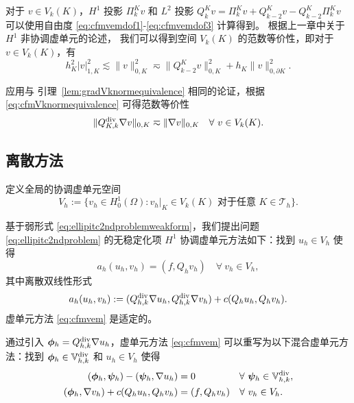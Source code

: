 对于 $v\in V_k(K)$，$H^1$ 投影 $\Pi_k^Kv$ 和 $L^2$ 投影 $Q_k^Kv= \Pi_k^Kv + Q_{k-2}^Kv-Q_{k-2}^K\Pi_k^Kv$ 可以使用自由度 \eqref{eq:cfmvemdof1}-\eqref{eq:cfmvemdof3} 计算得到。
根据上一章中关于 $H^1$ 非协调虚单元的论述，
我们可以得到空间 $V_k(K)$ 的范数等价性，即对于 $v\in V_k(K)$，有
\begin{equation}\label{eq:cfmVknormequivalence}
h_K^2|v|_{1,K}^2\lesssim\|v\|_{0,K}^2\eqsim \|Q_{k-2}^Kv\|_{0,K}^2 + h_K\|v\|_{0,\partial K}^2.
\end{equation}

应用与 引理~\ref{lem:gradVknormequivalence} 相同的论证，根据 
\eqref{eq:cfmVknormequivalence} 可得范数等价性
\begin{equation*}%
\|Q_{K,k}^{\diver}\nabla v\|_{0,K}\eqsim \|\nabla v\|_{0,K} \quad \forall~v\in V_k(K).
\end{equation*}


\subsection{离散方法}
定义全局的协调虚单元空间
\[
V_h:=\{v_h\in H_0^1(\Omega): v_h|_K\in V_k(K) \textrm{ 对于任意 } K\in\mathcal T_h\}.
\]

基于弱形式 \eqref{eq:ellipitc2ndproblemweakform}，我们提出问题 
\eqref{eq:ellipitc2ndproblem} 的无稳定化项 $H^1$ 
协调虚单元方法如下：找到 $u_h\in V_h$ 使得
\begin{equation}\label{eq:cfmvem}
a_h(u_h, v_h)=(f, Q_hv_h)\quad\forall~v_h\in V_h,
\end{equation} 
其中离散双线性形式 
\[
a_h(u_h, v_h):=(Q_{h,k}^{\operatorname{div}}\nabla u_h, Q_{h,k}^{\operatorname{div}}\nabla v_h)+c(Q_hu_h, Q_hv_h).
\]
虚单元方法 \eqref{eq:cfmvem} 是适定的。

通过引入 $\boldsymbol{\phi}_h=Q_{h,k}^{\operatorname{div}}\nabla u_h$，虚单元方法
\eqref{eq:cfmvem} 可以重写为以下混合虚单元方法：找到
$\boldsymbol{\phi}_h\in\mathbb{V}_{h,k}^{\rm div}$ 和 $u_h\in V_h$ 使得
\begin{equation*}
\begin{aligned}
(\boldsymbol{\phi}_h, \boldsymbol{\psi}_h) - (\boldsymbol{\psi}_h, \nabla u_h)&=0 \quad\quad\quad\quad\;\;\forall~\boldsymbol{\psi}_h\in\mathbb{V}_{h,k}^{\rm div},\\
(\boldsymbol{\phi}_h, \nabla v_h)+c(Q_hu_h, Q_hv_h)&=(f, Q_hv_h)\quad\forall~v_h\in V_h.
\end{aligned}
\end{equation*}

